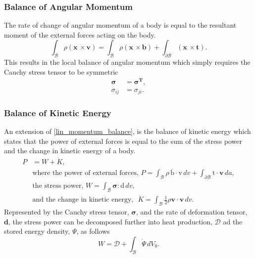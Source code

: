 \documentclass[../main.tex]{subfiles}
\begin{document}
\subsubsection{Balance of Angular Momentum}
The rate of change of angular momentum of a body is equal to the resultant moment of the external forces acting on the body.
\begin{equation}\label{angular_momentum}
    \int_{\mathcal{B}} \rho(\boldsymbol{x}\, \times \boldsymbol{v}) = \int_{\mathcal{B}} \rho(\boldsymbol{x}\, \times \boldsymbol{b}) + \int_{\partial\mathcal{B}} (\boldsymbol{x}\, \times \boldsymbol{t}).
\end{equation}
This results in the local balance of angular momentum which simply requires the Cauchy stress tensor to be symmetric
\begin{align} \label{cauchy_stress_sym}
    \boldsymbol{\sigma} &= \boldsymbol{\sigma ^{T}},\\
    \sigma _{ij} &= \sigma _{ji}.
\end{align}
\subsubsection{Balance of Kinetic Energy}
An extension of \eqref{lin_momentum_balance}, is the balance of kinetic energy which states that the power of external forces
 is equal to the sum of the stress power and the change in kinetic energy of a body.
\begin{align}\label{kin_energy}
    P &= W + \dot{K},\\
    &\text{where the power of external forces,} \,\, P = \int_{\mathcal{B}} \rho \,\boldsymbol{\overline{\mathrm{b}}} \cdot \boldsymbol{\mathrm{v}} \, dv + \int_{\partial \mathcal{B}} \boldsymbol{\mathrm{t}} \cdot \mathrm{\boldsymbol{v}} \, da,\\
    &\text{the stress power,} \,\, W = \int_{\mathcal{B}} \boldsymbol{\sigma} : \boldsymbol{\mathrm{d}} \,dv,\\
    &\text{and the change in kinetic energy, }\,\, \dot{K} = \int_{\mathcal{B}} \frac{1}{2} \rho \mathrm{\boldsymbol{v}} \cdot \mathrm{\boldsymbol{v}} \, dv.
\end{align}
Represented by the Cauchy stress tensor, $\boldsymbol{\sigma}$, and the rate of deformation tensor, \textbf{d},
 the stress power can be decomposed further into heat production, $\mathcal{D}$ ad the stored energy density, $\Psi$, as follows
\begin{equation}\label{stress_power}
    W = \mathcal{D} + \int_{\mathcal{B}} \dot{\Psi}\,dV_{0}.
\end{equation} 
\end{document}
